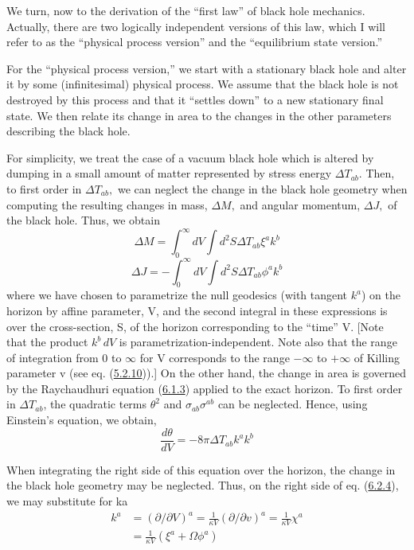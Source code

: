 \documentclass[11pt,a4paper]{article}
\begin{document}
We turn, now to the derivation of the ``first law'' of black hole mechanics. Actually, there are two logically independent versions of this law, which I will refer to as the ``physical process version'' and the ``equilibrium state version.''

For the ``physical process version,'' we start with a stationary black hole and alter it by some (infinitesimal) physical process. We assume that the black hole is not destroyed by this process and that it ``settles down'' to a new stationary final state. We then relate its change in area to the changes in the other parameters describing the black hole.

For simplicity, we treat the case of a vacuum black hole which is altered by dumping in a small amount of matter represented by stress energy \(\Delta T_{ab}.\) Then, to first order in \(\Delta T_{ab},\) we can neglect the change in the black hole geometry when computing the resulting changes in mass, \(\Delta M,\) and angular momentum, \(\Delta J,\) of the black hole. Thus, we obtain
\begin{equation*}
\Delta M = \int_0^\infty dV \int d^2S \Delta T_{ab} \xi^a k^b \tag{6.2.2}\label{eq:6.2.2}
\end{equation*}
\begin{equation*}
\Delta J = -\int_0^\infty dV \int d^2S \Delta T_{ab} \phi^a k^b \tag{6.2.3}\label{eq:6.2.3}
\end{equation*}
where we have chosen to parametrize the null geodesics (with tangent \(k^a\)) on the horizon by affine parameter, V, and the second integral in these expressions is over the cross-section, S, of the horizon corresponding to the ``time'' V. {[}Note that the product \(k^b\,dV\) is parametrization-independent. Note also that the range of integration \hypertarget{source-155}{} from 0 to \(\infty\) for V corresponds to the range \(-\infty\) to \(+\infty\) of Killing parameter v (see eq. (\hyperref[eq:5.2.10]{5.2.10})).{]} On the other hand, the change in area is governed by the Raychaudhuri equation (\hyperref[eq:6.1.3]{6.1.3}) applied to the exact horizon. To first order in \(\Delta T_{ab}\), the quadratic terms \(\theta^2\) and \(\sigma_{ab}\sigma^{ab}\) can be neglected. Hence, using Einstein's equation, we obtain,
\begin{equation*}
\frac{d\theta}{dV} = -8\pi \Delta T_{ab} k^{a}k^{b} \tag{6.2.4}\label{eq:6.2.4}
\end{equation*}

When integrating the right side of this equation over the horizon, the change in the black hole geometry may be neglected. Thus, on the right side of eq. (\hyperref[eq:6.2.4]{6.2.4}), we may substitute for ka
\begin{equation*}
\begin{aligned}k^{a} &= (\partial/\partial V)^{a} = \frac{1}{\kappa V} (\partial/\partial v)^{a} = \frac{1}{\kappa V} \chi^{a}\\&= \frac{1}{\kappa V} (\xi^{a} + \Omega \phi^{a})\end{aligned} \tag{6.2.5}\label{eq:6.2.5}
\end{equation*}
\end{document}

